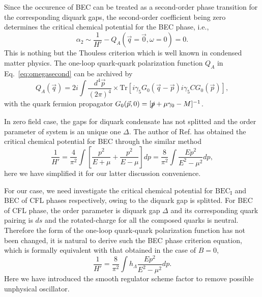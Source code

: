 \documentclass[prd, showpacs,nofootinbib,amsmath,amssymb]{revtex4}
\begin{document}
Since the occurence of BEC  can be treated as  a second-order phase transition for the corresponding diquark gaps,
the second-order coefficient being zero determines the critical chemical potential for the BEC phase, i.e.,
\begin{equation}
\label{eq:bdiquark}
	\alpha_2 \sim \frac{1}{H'} - Q_A(\vec{q} = \vec{0},\omega =0) =0.
\end{equation}
This is nothing but the Thouless criterion which is well known in condensed matter physics.
The one-loop quark-quark polarization function  $Q_A$ in Eq.~\eqref{eq:omegasecond} can be archived by
\begin{equation}
\label{eq:qqpol}
Q_A(\vec{q})
= 2i\int \frac{d^4\vec{p}}{(2\pi)^4}
\times \text{Tr}[i\gamma_5G_0(\vec{q}-\vec{p})i\gamma_5 C G_0(\vec{p})],
\end{equation}
with the  quark fermion propagator $G_0(\vec{p}, 0) = [\slashed{p}+\mu\gamma_0 - M]^{-1} $.

In zero field case, the gaps for diquark condensate has not splitted  and the
order parameter of system is an unique one $\Delta$. The author of Ref.\cite{abuki2010nambu} has obtained the critical chemical potential for BEC through the similar method
\begin{equation}\label{eq:criticalfor0}
  \frac{1}{H'} =\frac{4}{\pi^2}\int [\frac{  p^2}{E + \mu} +\frac{  p^2}{E - \mu}] dp =\frac{8}{ \pi^2} \int  \frac{ E p^2}{E^2 - \mu^2} dp,
\end{equation}
here we have simplified it for our latter discussion convenience.




For our case,  we need investigate the critical chemical potential for $\text{BEC}_\text{I}$ and BEC of CFL  phases respectively, owing to the diquark gap is  splitted.
For BEC of CFL  phase,
the order parameter is  diquark gap $\Delta$ and its corresponding quark pairing is $ds$ and the rotated-charge for all the composed quarks
is neutral.
Therefore the form of the one-loop quark-quark polarization function has not been changed,
it is natural to derive such the BEC phase criterion equation, which is formally equivalent with that obtained in the case of $B = 0$,
\begin{equation}
\label{eq:criticalforn}
\frac{1}{H'} =\frac{8}{ \pi^2} \int h_\Lambda  \frac{ E p^2}{E^2 - \mu^2} dp.
\end{equation}
Here we have introduced the smooth regulator scheme factor to remove possible unphysical oscillator.
\end{document}
